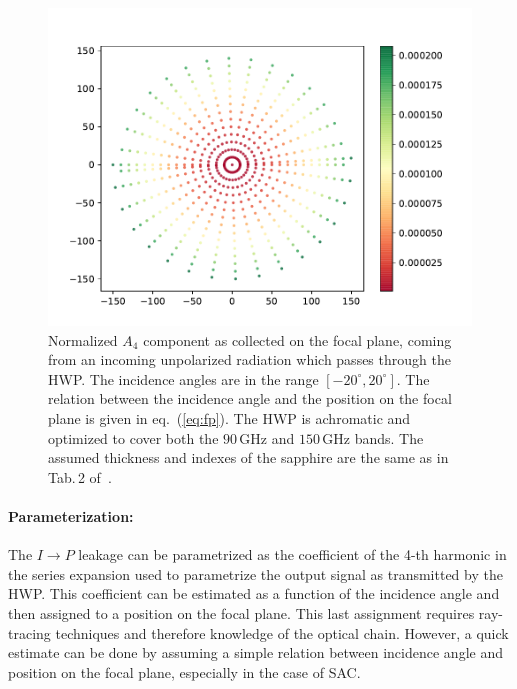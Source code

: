 \begin{figure}
\begin{center}
\includegraphics{figures/A4_focalPlane.pdf}
\end{center}
\caption{Normalized $A_4$ component as collected on the focal plane, coming from an incoming unpolarized radiation which passes through the HWP. The incidence angles are in the range $[-20^\circ,20^\circ]$. The relation between the incidence angle and the position on the focal plane is given in eq.~(\ref{eq:fp}). The HWP is achromatic and optimized to cover both the $90\,\mathrm{GHz}$ and $150\,\mathrm{GHz}$ bands. The assumed thickness and indexes of the sapphire are the same as in Tab.\,2 of~\cite{PB2a_WHWP}.}\label{fig:ip_fp}
\end{figure}

\paragraph{Parameterization:}
The $I\rightarrow P$ leakage can be parametrized as the coefficient of the 4-th harmonic in the series expansion used to parametrize the output signal as transmitted by the HWP. This coefficient can be estimated as a function of the incidence angle and then assigned to a position on the focal plane. This last assignment requires ray-tracing techniques and therefore knowledge of the optical chain. However, a quick estimate can be done by assuming a simple relation between incidence angle and position on the focal plane, especially in the case of SAC.

